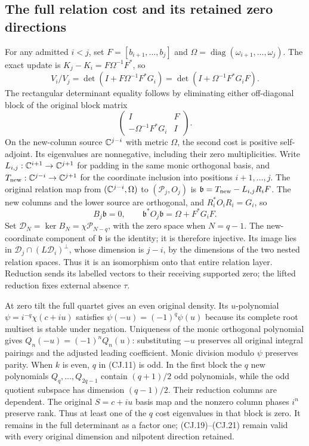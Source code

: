 \subsection{The full relation cost and its retained zero directions}

For any admitted $i<j$, set $F=[b_{i+1},\ldots,b_j]$ and
$\Omega=\operatorname{diag}(\omega_{i+1},\ldots,\omega_j)$.
The exact update is $K_j-K_i=F\Omega^{-1}F^*$, so
\[
 V_i/V_j=\det(I+F\Omega^{-1}F^*G_i)
         =\det(I+\Omega^{-1}F^*G_iF).
 \tag{CJ.20}
\]
The rectangular determinant equality follows by eliminating either
off-diagonal block of the original block matrix
\[
 \begin{pmatrix}I&F\\-\Omega^{-1}F^*G_i&I\end{pmatrix}.
\]
On the new-column source $\mathbb{C}^{j-i}$ with metric $\Omega$, the
second cost is positive self-adjoint. Its eigenvalues are
nonnegative, including their zero multiplicities.
Write $L_{i,j}:\mathbb{C}^{i+1}\to\mathbb{C}^{j+1}$ for padding in the
same monic orthogonal basis, and
$T_{\rm new}:\mathbb{C}^{j-i}\to\mathbb{C}^{j+1}$ for the coordinate inclusion
into positions $i+1,\ldots,j$. The original relation map from
$(\mathbb{C}^{j-i},\Omega)$ to $(\mathcal P_j,O_j)$ is
$\mathfrak b=T_{\rm new}-L_{i,j}R_iF$.
The new columns and the lower source are orthogonal, and
$R_i^*O_iR_i=G_i$, so
\[
 B_j\mathfrak b=0,\qquad
 \mathfrak b^*O_j\mathfrak b=\Omega+F^*G_iF.
 \tag{CJ.21}
\]
Set $\mathcal D_N=\ker B_N=\chi\mathcal P_{N-q}$, with the
zero space when $N=q-1$. The new-coordinate component of $\mathfrak b$ is the identity;
it is therefore injective. Its image lies in
$\mathcal D_j\cap(L\mathcal D_i)^\perp$, whose dimension is
$j-i$, by the dimensions of the two nested relation spaces.
Thus it is an isomorphism onto that entire relation layer.
Reduction sends its labelled vectors to their receiving supported
zero; the lifted reduction fixes external absence $\tau$.

At zero tilt the full quartet gives an even original density.
Its $u$-polynomial $\psi=i^{-q}\chi(c+iu)$ satisfies
$\psi(-u)=(-1)^q\psi(u)$ because its complete root multiset
is stable under negation. Uniqueness of the monic orthogonal
polynomial gives $Q_n(-u)=(-1)^nQ_n(u)$: substituting $-u$
preserves all original integral pairings and the adjusted leading
coefficient. Monic division modulo $\psi$ preserves parity.
When $k$ is even, $q$ in (CJ.11) is odd. In the first block
the $q$ new polynomials $Q_q,\ldots,Q_{2q-1}$ contain
$(q+1)/2$ odd polynomials, while the odd quotient subspace has
dimension $(q-1)/2$. Their reduction columns are dependent.
The original $S=c+iu$ basis map and the nonzero column phases
$i^n$ preserve rank. Thus at least one of the $q$ cost eigenvalues
in that block is zero. It remains in the full determinant as a
factor one; (CJ.19)--(CJ.21) remain valid with every original
dimension and nilpotent direction retained.

